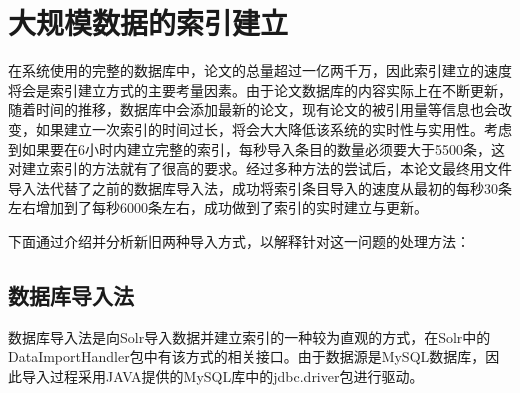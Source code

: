 
\chapter{大规模数据的索引建立}
\label{chap:c3}

在系统使用的完整的数据库中，论文的总量超过一亿两千万，因此索引建立的速度将会是索引建立方式的主要考量因素。由于论文数据库的内容实际上在不断更新，随着时间的推移，数据库中会添加最新的论文，现有论文的被引用量等信息也会改变，如果建立一次索引的时间过长，将会大大降低该系统的实时性与实用性。考虑到如果要在6小时内建立完整的索引，每秒导入条目的数量必须要大于5500条，这对建立索引的方法就有了很高的要求。经过多种方法的尝试后，本论文最终用文件导入法代替了之前的数据库导入法，成功将索引条目导入的速度从最初的每秒30条左右增加到了每秒6000条左右，成功做到了索引的实时建立与更新。

下面通过介绍并分析新旧两种导入方式，以解释针对这一问题的处理方法：
\section{数据库导入法}
数据库导入法是向Solr导入数据并建立索引的一种较为直观的方式，在Solr中的DataImportHandler包中有该方式的相关接口。由于数据源是MySQL数据库，因此导入过程采用JAVA提供的MySQL库中的jdbc.driver包进行驱动。

